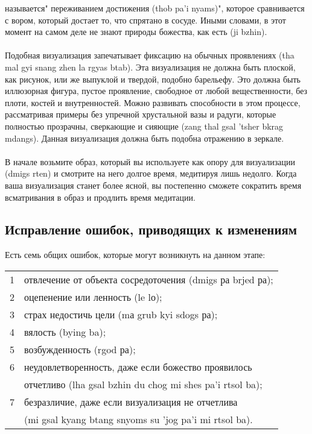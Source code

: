 называется" переживанием достижения (thob pa'i nyams)", которое сравнивается с вором,
который достает то, что спрятано в сосуде. Иными словами, в этот момент на самом деле не
знают природы божества, как есть (ji bzhin).\\
\\
Подобная визуализация запечатывает фиксацию на обычных проявлениях (tha mal gyi
snang zhen la rgyas btab). Эта визуализация не должна быть плоской, как рисунок, или же
выпуклой и твердой, подобно барельефу. Это должна быть иллюзорная фигура, пустое
проявление, свободное от любой вещественности, без плоти, костей и внутренностей. Можно
развивать способности в этом процессе, рассматривая примеры без упречной хрустальной
вазы и радуги, которые полностью прозрачны, сверкающие и сияющие (zang thal gsal 'tsher
bkrag mdangs). Данная визуализация должна быть подобна отражению в зеркале.\\
\\
В начале возьмите образ, который вы используете как опору для визуализации (dmigs
rten) и смотрите на него долгое время, медитируя лишь недолго. Когда ваша визуализация
станет более ясной, вы постепенно сможете сократить время всматривания в образ и
продлить время медитации.

\subsection{Исправление ошибок, приводящих к изменениям}

Есть семь общих ошибок, которые могут возникнуть на данном этапе:

\begin{tabular}{ll}
1 & отвлечение от объекта сосредоточения (dmigs ра brjed ра);\\
2 & оцепенение или ленность (le lо);\\
3 & страх недостичь цели (mа grub kyi sdogs ра);\\
4 & вялость (bying ba);\\
5 & возбужденность (rgod ра);\\
6 & неудовлетворенность, даже если божество проявилось \\
  & отчетливо (lha gsal bzhin du chog mi shes pa'i rtsol ba);\\
7 & безразличие, даже если визуализация не отчетлива \\
  & (mi gsal kyang btang snyoms su 'jog pa'i mi rtsol ba).\\
\end{tabular}

